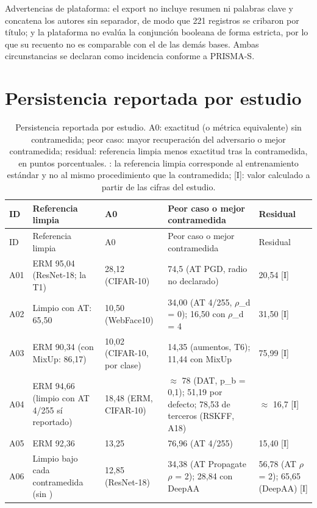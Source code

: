 \documentclass[pdflatex,sn-mathphys-num]{sn-jnl}
\theoremstyle{thmstyleone}
\theoremstyle{thmstyletwo}
\theoremstyle{thmstylethree}
\begin{document}
\begin{appendices}
\begin{quote}
\end{quote}
Advertencias de plataforma: el export no incluye resumen ni palabras clave y concatena los autores sin separador, de modo que 221 registros se cribaron por título; y la plataforma no evalúa la conjunción booleana de forma estricta, por lo que su recuento no es comparable con el de las demás bases. Ambas circunstancias se declaran como incidencia conforme a PRISMA-S.


\section{Persistencia reportada por estudio}\label{app:persist}

\begin{longtable}{@{}L{0.95cm}L{2.7cm}L{2.2cm}L{3.5cm}L{2.2cm}@{}}
\caption{Persistencia reportada por estudio. A0: exactitud (o métrica equivalente) sin contramedida; peor caso: mayor recuperación del adversario o mejor contramedida; residual: referencia limpia menos exactitud tras la contramedida, en puntos porcentuales. \textdagger{}: la referencia limpia corresponde al entrenamiento estándar y no al mismo procedimiento que la contramedida; [I]: valor calculado a partir de las cifras del estudio.}\label{tab:persist}\\
\toprule
ID & Referencia limpia & A0 & Peor caso o mejor contramedida & Residual \\
\midrule
\endfirsthead
\toprule
ID & Referencia limpia & A0 & Peor caso o mejor contramedida & Residual \\
\midrule
\endhead
\botrule
\endfoot
A01 & ERM\textdagger{} 95,04 (ResNet-18; la T1) & 28,12 (CIFAR-10) & 74,5 (AT PGD, radio no declarado) & 20,54\textdagger{} [I] \\
A02 & Limpio con AT: 65,50 & 10,50 (WebFace10) & 34,00 (AT 4/255, $\rho$\_d = 0); 16,50 con $\rho$\_d = 4 & 31,50 [I] \\
A03 & ERM\textdagger{} 90,34 (con MixUp: 86,17) & 10,02 (CIFAR-10, por clase) & 14,35 (aumentos, T6); 11,44 con MixUp & 75,99\textdagger{} [I] \\
A04 & ERM\textdagger{} 94,66 (limpio con AT 4/255 sí reportado) & 18,48 (ERM, CIFAR-10) & $\approx$ 78 (DAT, p\_b = 0,1); 51,19 por defecto; 78,53 de terceros (RSKFF, A18) & $\approx$ 16,7\textdagger{} [I] \\
A05 & ERM\textdagger{} 92,36 & 13,25 & 76,96 (AT 4/255) & 15,40\textdagger{} [I] \\
A06 & Limpio bajo cada contramedida (sin \textdagger{}) & 12,85 (ResNet-18) & 34,38 (AT Propagate $\rho$ = 2); 28,84 con DeepAA & 56,78 (AT $\rho$ = 2); 65,65 (DeepAA) [I] \\

\end{longtable}
\end{appendices}
\end{document}

